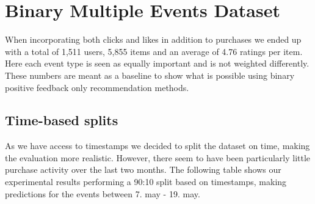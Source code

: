 \section{Binary Multiple Events Dataset}

When incorporating both clicks and likes in addition to purchases we ended up with a total of 1,511 users, 5,855 items
and an average of 4.76 ratings per item. Here each event type is seen as equally important and is not weighted differently.
These numbers are meant as a baseline to show what is possible using binary positive feedback only recommendation methods.

\subsection{Time-based splits}

As we have access to timestamps we decided to split the dataset on time, making the evaluation more realistic. However,
there seem to have been particularly little purchase activity over the last two months. The following table shows our
experimental results performing a 90:10 split based on timestamps, making predictions for the events between 7. may -
19. may.

